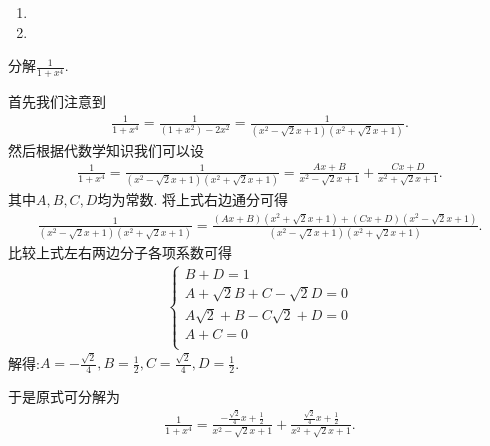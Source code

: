 \documentclass[../../main.tex]{subfiles}%
\begin{document}
\begin{solution}
\begin{enumerate}
于是原式可分解为
\begin{align*}
\frac{1}{\left( 1+x^2 \right) \left( 1+x \right) ^2}=\frac{-x}{2\left( 1+x^2 \right)}+\frac{1}{2+2x}+\frac{1}{2\left( 1+x \right) ^2}.
\end{align*}

\item 

\item 
\end{enumerate}

\end{solution}

\begin{example}
分解$\frac{1}{1+x^4}$.
\end{example}
\begin{solution}
首先我们注意到
\begin{align*}
\frac{1}{1+x^4}=\frac{1}{\left( 1+x^2 \right) -2x^2}=\frac{1}{\left( x^2-\sqrt{2}x+1 \right) \left( x^2+\sqrt{2}x+1 \right)}.
\end{align*}
然后根据代数学知识我们可以设
\begin{align}\label{equation:little tech eq3}
\frac{1}{1+x^4}=\frac{1}{\left( x^2-\sqrt{2}x+1 \right) \left( x^2+\sqrt{2}x+1 \right)}=\frac{Ax+B}{x^2-\sqrt{2}x+1}+\frac{Cx+D}{x^2+\sqrt{2}x+1}.  
\end{align}
其中$A,B,C,D$均为常数.
将上式右边通分可得
\begin{align*}
\frac{1}{\left( x^2-\sqrt{2}x+1 \right) \left( x^2+\sqrt{2}x+1 \right)}=\frac{\left( Ax+B \right) \left( x^2+\sqrt{2}x+1 \right) +\left( Cx+D \right) \left( x^2-\sqrt{2}x+1 \right)}{\left( x^2-\sqrt{2}x+1 \right) \left( x^2+\sqrt{2}x+1 \right)}.
\end{align*}
比较上式左右两边分子各项系数可得
\begin{align*}
\begin{cases}
B+D=1\\
A+\sqrt{2}B+C-\sqrt{2}D=0\\
A\sqrt{2}+B-C\sqrt{2}+D=0\\
A+C=0\\
\end{cases}
\end{align*}
解得:$A=-\frac{\sqrt{2}}{4},B=\frac{1}{2},C=\frac{\sqrt{2}}{4},D=\frac{1}{2}$.

于是原式可分解为
\begin{align*}
\frac{1}{1+x^4}=\frac{-\frac{\sqrt{2}}{4}x+\frac{1}{2}}{x^2-\sqrt{2}x+1}+\frac{\frac{\sqrt{2}}{4}x+\frac{1}{2}}{x^2+\sqrt{2}x+1}.
\end{align*}

\end{solution}
\end{document}
